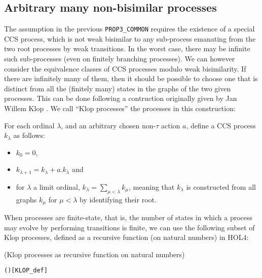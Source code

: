 \subsection{Arbitrary many non-bisimilar processes}

The assumption in the  previous \texttt{PROP3_COMMON} requires the
existence of a special CCS process, which is not weak bisimilar to
any sub-process emanating from the two root processes by weak
transitions. In the worst case, there may be infinite such
sub-processes (even on finitely branching processes).
We can however consider  the equivalence classes of CCS processes 
modulo weak bisimilarity.
If there are infinitely many of them, 
then it should be 
possible to choose one  that is distinct from all the (finitely many) states in the
graphs of the two given processes.  
This can be done following a contruction originally given by 
 Jan Willem Klop \cite{van2005characterisation}.
 We call  ``Klop processes''  the processes in this construction:
\begin{definition}
For each ordinal $\lambda$, and an arbitrary chosen non-$\tau$ action $a$,
define a CCS process $k_\lambda$ as follows:
\begin{itemize}
\item $k_0 = 0$,
\item $k_{\lambda+1} = k_\lambda + a.k_\lambda$ and
\item for $\lambda$ a limit ordinal, $k_\lambda = \sum_{\mu < \lambda}
  k_\mu$, meaning that $k_\lambda$ is constructed from all graphs
  $k_\mu$ for $\mu < \lambda$ by identifying their root.
\end{itemize}
\end{definition}
When processes are finite-state, that is,
the number of  states in which a process may evolve by performing
transitions is finite, 
we can use  the following subset of Klop processes, 
defined as a recursive function (on natural numbers) in HOL4:
\begin{definition}{(Klop processes as recursive function on natural numbers)}
\begin{alltt}
   \HOLSymConst{=} 
  ( ) \HOLSymConst{=}    \HOLSymConst{\ensuremath{+}}    \hfill{[KLOP_def]}
\end{alltt}
\end{definition}

